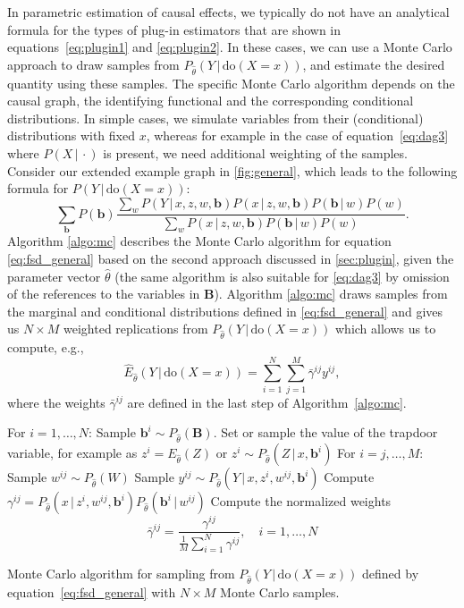 \documentclass[11pt,a4paper,twoside]{article}
\newcommand{\+}[1]{\ensuremath{\mathbf{#1}}}
\newcommand{\doo}{\textrm{do}}
\newcommand{\given}{{ \, | \, }}
\newcommand{\z}{trapdoor variable}
\begin{document}
	In parametric estimation of causal effects, we typically do not have an analytical formula for the types of plug-in estimators that are shown in equations~\eqref{eq:plugin1} and \eqref{eq:plugin2}. In these cases, we can use a Monte Carlo approach to draw samples from $P_{\hat \theta}(Y \given \doo(X = x))$, and estimate the desired quantity using these samples. The specific Monte Carlo algorithm depends on the causal graph, the identifying functional and the corresponding conditional distributions. In simple cases, we simulate variables from their (conditional) distributions with fixed $x$, whereas for example in the case of equation~\eqref{eq:dag3} where $P(X \given \cdot)$ is present, we need additional weighting of the samples. Consider our extended example graph in \autoref{fig:general}, which leads to the following formula for $P(Y \given \doo(X = x))$:
		\begin{equation}
	\label{eq:fsd_general}
	 \sum_{\+b} P(\+b)\frac{\sum_{w} P(Y \given x, z, w, \+b)P(x \given z,w,\+b)P(\+b \given w)P(w)}{\sum_{w} P(x \given z,w,\+b)P(\+b\given w)P(w)}.
	\end{equation}
	Algorithm \ref{algo:mc} describes the Monte Carlo algorithm for equation \eqref{eq:fsd_general} based on the second approach discussed in \autoref{sec:plugin}, given the parameter vector $\hat \theta$ (the same algorithm is also suitable for \eqref{eq:dag3} by omission of the references to the variables in $\+ B$). Algorithm \ref{algo:mc} draws samples from the marginal and conditional distributions defined in \eqref{eq:fsd_general} and gives us $N \times M$ weighted replications from $P_{\hat \theta}(Y \given \doo(X = x))$ which allows us to compute, e.g.,
\begin{equation}\label{eq:mc-mean}
\widehat E_{\hat \theta}(Y \given \doo(X = x)) = \sum_{i=1}^{N}\sum_{j=1}^{M} \bar \gamma^{ij} y^{ij},
\end{equation}
where the weights $\bar \gamma^{ij}$ are defined in the last step of Algorithm~\ref{algo:mc}. 

		\begin{algorithm}[!t]
	\begin{algorithmic}[1]
		\State For $i = 1,\ldots,N$:
		\State \quad Sample $\+b^i \sim P_{\hat \theta}(\+B)$.
		\State \quad Set or sample the value of the \z, for example as $z^i = E_{\hat \theta}(Z)$ or $z^i \sim P_{\hat \theta}(Z \given  x, \+b^i)$
		\State \quad For $i = j, \ldots, M$:
		\State \quad \quad Sample $w^{ij} \sim P_{\hat \theta}(W)$
		\State \quad \quad Sample $y^{ij} \sim P_{\hat \theta}(Y \given  x, z^i, w^{ij}, \+b^i)$
		\State \quad \quad Compute $\gamma^{ij} =  P_{\hat \theta}(x \given z^i, w^{ij}, \+b^i) P_{\hat \theta}(\+b^i \given  w^{ij})$
		\State \quad Compute the normalized weights
		\[
		\bar \gamma^{ij} = \frac{\gamma^{ij}}{\frac{1}{M}\sum_{i=1}^N \gamma^{ij}}, \quad i = 1, \ldots, N
		\]
	\end{algorithmic}
	\caption{Monte Carlo algorithm for sampling from $P_{\hat \theta}(Y \given \doo(X = x))$ defined by equation~\eqref{eq:fsd_general} with $N \times M$ Monte Carlo samples.}
	\label{algo:mc}
\end{algorithm}
\end{document}
